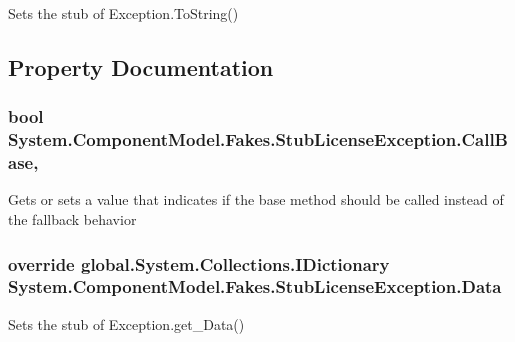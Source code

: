 Sets the stub of Exception.\-To\-String()



\subsection{Property Documentation}
\hypertarget{class_system_1_1_component_model_1_1_fakes_1_1_stub_license_exception_aeab995730d0ff35f636e4e4113da0c22}{
\subsubsection[{Call\-Base}]{\setlength{\rightskip}{0pt plus 5cm}bool System.\-Component\-Model.\-Fakes.\-Stub\-License\-Exception.\-Call\-Base\hspace{0.3cm}{\ttfamily [get]}, {\ttfamily [set]}}}\label{class_system_1_1_component_model_1_1_fakes_1_1_stub_license_exception_aeab995730d0ff35f636e4e4113da0c22}


Gets or sets a value that indicates if the base method should be called instead of the fallback behavior

\hypertarget{class_system_1_1_component_model_1_1_fakes_1_1_stub_license_exception_ae713331577d4b73c1915ab3e6c7928cc}{
\subsubsection[{Data}]{\setlength{\rightskip}{0pt plus 5cm}override global.\-System.\-Collections.\-I\-Dictionary System.\-Component\-Model.\-Fakes.\-Stub\-License\-Exception.\-Data\hspace{0.3cm}{\ttfamily [get]}}}\label{class_system_1_1_component_model_1_1_fakes_1_1_stub_license_exception_ae713331577d4b73c1915ab3e6c7928cc}


Sets the stub of Exception.\-get\-\_\-\-Data()

